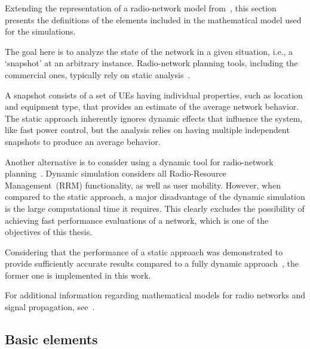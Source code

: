 Extending the representation of a radio-network model from~\cite{Nawrocki-Understanding_UMTS_radio_network_modelling_and_optimisation:2006},
this section presents the definitions of the elements included in
the mathematical model used for the simulations.

The goal here is to analyze the state of the network in a given situation,
i.e., a \textquoteleft{}snapshot\textquoteright{} at an arbitrary
instance. Radio-network planning tools, including the commercial ones,
typically rely on static analysis~\cite{Niemela-Performance_of_static_WCDMA_simulator:2005}.

A snapshot consists of a set of UEs having individual properties,
such as location and equipment type, that provides an estimate of
the average network behavior. The static approach inherently ignores
dynamic effects that influence the system, like fast power control,
but the analysis relies on having multiple independent snapshots to
produce an average behavior.

Another alternative is to consider using a dynamic tool for radio-network
planning~\cite{Hamalainen-Advanced_WCDMA_radio_network_simulator:1999,Hoppe-Fast_planning_of_efficient_WCDMA_radio_networks:2001}.
Dynamic simulation considers all Radio-Resource Management~(RRM)
functionality, as well as user mobility. However, when compared to
the static approach, a major disadvantage of the dynamic simulation
is the large computational time it requires. This clearly excludes
the possibility of achieving fast performance evaluations of a network,
which is one of the objectives of this thesis.

Considering that the performance of a static approach was demonstrated
to provide sufficiently accurate results compared to a fully dynamic
approach~\cite{RadioNetworkPlanningAndOptimisationForUMTS,Laiho-Verification_of_WCDMA_network_planning_prediction_with_dynamic_simulations:2001},
the former one is implemented in this work.

For additional information regarding mathematical models for radio
networks and signal propagation, see~\cite{RadioNetworkPlanningAndOptimisationForUMTS,Nawrocki-Understanding_UMTS_radio_network_modelling_and_optimisation:2006,Stuber-Principles_of_mobile_communication:2011}.


\subsection{Basic elements}

